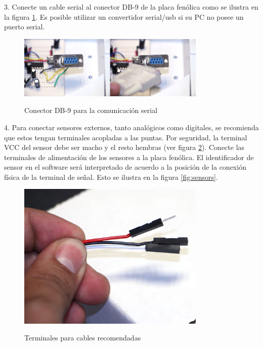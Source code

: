 \documentclass[letterpaper]{book}
\begin{document}
3. Conecte un cable serial al conector DB-9 de la placa fenólica como se ilustra en la figura \ref{fig:serialCable}. Es posible utilizar un convertidor serial/usb si su PC no posee un puerto serial.\\
\begin{figure}
\begin{center}
\includegraphics[width=0.8\textwidth]{figures/serialcable.jpg}
\caption{Conector DB-9 para la comunicación serial}
\centering
\label{fig:serialCable}
\end{center}
\end{figure} 
4. Para conectar sensores externos, tanto analógicos como digitales, se recomienda que estos tengan terminales acopladas a las puntas. Por seguridad, la terminal VCC del sensor debe ser macho y el resto hembras (ver figura \ref{fig:cables}). Conecte las terminales de alimentación de los sensores a la placa fenólica. El identificador de sensor en el software será  interpretado de acuerdo a la posición de la conexión física de la terminal de señal. Esto se ilustra en la figura \ref{fig:sensors}.\\
\begin{figure}
\begin{center}
\includegraphics[width=0.8\textwidth]{figures/cables.jpg}
\caption{Terminales para cables recomendadas}
\centering
\label{fig:cables}
\end{center}
\end{figure} 
\end{document}

